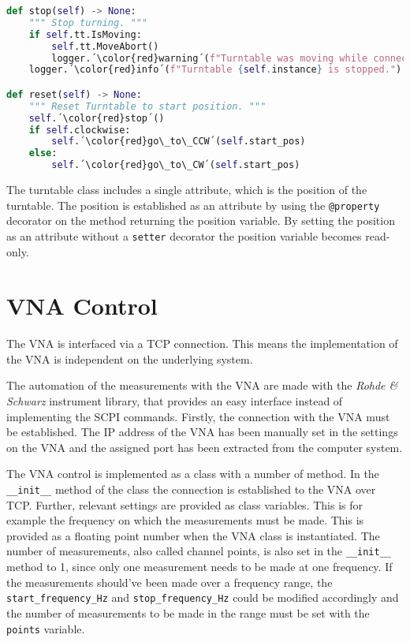 \begin{lstlisting}[language=Python, caption=Method for resetting the turntable to start position.]
def stop(self) -> None:
    """ Stop turning. """
    if self.tt.IsMoving:
        self.tt.MoveAbort()
        logger.´\color{red}warning´(f"Turntable was moving while connection was stopped for {self.instance}.")
    logger.´\color{red}info´(f"Turntable {self.instance} is stopped.")

def reset(self) -> None:
    """ Reset Turntable to start position. """
    self.´\color{red}stop´()
    if self.clockwise:
        self.´\color{red}go\_to\_CCW´(self.start_pos)
    else:
        self.´\color{red}go\_to\_CW´(self.start_pos)
\end{lstlisting}

The turntable class includes a single attribute, which is the position of the turntable. The position is established as an attribute by using the \verb+@property+ decorator on the method returning the position variable. By setting the position as an attribute without a \verb+setter+ decorator the position variable becomes read-only. 

\section{VNA Control}
The VNA is interfaced via a TCP connection. This means the implementation of the VNA is independent on the underlying system. 

The automation of the measurements with the VNA are made with the \textit{Rohde \& Schwarz} instrument library, that provides an easy interface instead of implementing the SCPI commands. Firstly, the connection with the VNA must be established. The IP address of the VNA has been manually set in the settings on the VNA and the assigned port has been extracted from the computer system. 

The VNA control is implemented as a class with a number of method. In the \verb+__init__+ method of the class the connection is  established to the VNA over TCP. Further, relevant settings are provided as class variables. This is for example the frequency on which the measurements must be made. This is provided as a floating point number when the VNA class is instantiated. The number of measurements, also called channel points, is also set in the \verb+__init__+ method to 1, since only one measurement needs to be made at one frequency. If the measurements should've been made over a frequency range, the \verb+start_frequency_Hz+ and \verb+stop_frequency_Hz+ could be modified accordingly and the number of measurements to be made in the range must be set with the \verb+points+ variable.


